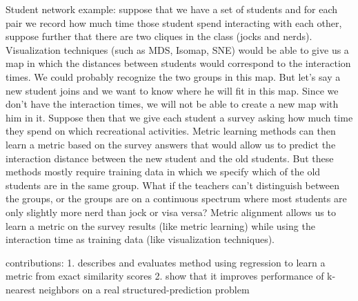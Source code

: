 
Student network example: suppose that we have a set of students and for each pair we record how much time those student spend interacting with each other, suppose further that there are two cliques in the class (jocks and nerds). Visualization techniques (such as MDS, Isomap, SNE) would be able to give us a map in which the distances between students would correspond to the interaction times. We could probably recognize the two groups in this map. But let's say a new student joins and we want to know where he will fit in this map. Since we don't have the interaction times, we will not be able to create a new map with him in it. Suppose then that we give each student a survey asking how much time they spend on which recreational activities. Metric learning methods can then learn a metric based on the survey answers that would allow us to predict the interaction distance between the new student and the old students. But these methods mostly require training data in which we specify which of the old students are in the same group. What if the teachers can't distinguish between the groups, or the groups are on a continuous spectrum where most students are only slightly more nerd than jock or visa versa? Metric alignment allows us to learn a metric on the survey results (like metric learning) while using the interaction time as training data (like visualization techniques).

contributions: 
1. describes and evaluates method using regression to learn a metric from exact similarity scores 
2. show that it improves performance of k-nearest neighbors on a real structured-prediction problem

